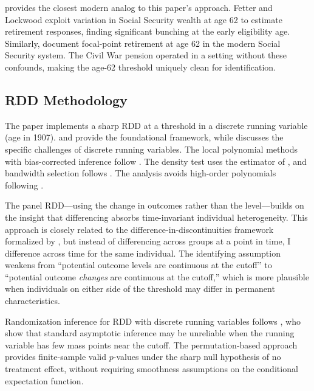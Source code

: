 \documentclass[12pt]{article}
\begin{document}
\citet{fetter2018} provides the closest modern analog to this paper's approach. Fetter and Lockwood exploit variation in Social Security wealth at age 62 to estimate retirement responses, finding significant bunching at the early eligibility age. Similarly, \citet{behaghel2012} document focal-point retirement at age 62 in the modern Social Security system. The Civil War pension operated in a setting without these confounds, making the age-62 threshold uniquely clean for identification.

\subsection{RDD Methodology}

The paper implements a sharp RDD at a threshold in a discrete running variable (age in 1907). \citet{ImbensLemieux2008} and \citet{lee2010regression} provide the foundational framework, while \citet{cattaneo2020practical} discusses the specific challenges of discrete running variables. The local polynomial methods with bias-corrected inference follow \citet{calonico2014robust}. The density test uses the estimator of \citet{cattaneo2020rddensity}, and bandwidth selection follows \citet{imbens2012optimal}. The analysis avoids high-order polynomials following \citet{gelman2019high}.

The panel RDD---using the change in outcomes rather than the level---builds on the insight that differencing absorbs time-invariant individual heterogeneity. This approach is closely related to the difference-in-discontinuities framework formalized by \citet{grembi2016fiscal}, but instead of differencing across groups at a point in time, I difference across time for the same individual. The identifying assumption weakens from ``potential outcome levels are continuous at the cutoff'' to ``potential outcome \textit{changes} are continuous at the cutoff,'' which is more plausible when individuals on either side of the threshold may differ in permanent characteristics.

Randomization inference for RDD with discrete running variables follows \citet{CattaneoFrandsenTitiunik2015}, who show that standard asymptotic inference may be unreliable when the running variable has few mass points near the cutoff. The permutation-based approach provides finite-sample valid $p$-values under the sharp null hypothesis of no treatment effect, without requiring smoothness assumptions on the conditional expectation function.


\end{document}
